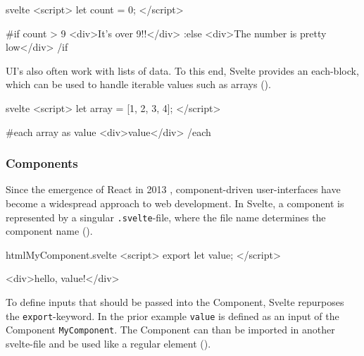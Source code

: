\begin{listing}[h!]
\begin{myminted}{svelte}{}
<script>
  let count = 0;
</script>

{#if count > 9}
  <div>It's over 9!!</div>
{:else}
  <div>The number is pretty low</div>
{/if}
\end{myminted}
\caption{Example usage of Svelte's if-block.}
\label{fig:svelte-if-syntax} 
\end{listing}

UI's also often work with lists of data. To this end, Svelte provides an each-block, which can be used to handle iterable values such as arrays ().

\begin{listing}[h!]
\begin{myminted}{svelte}{}
<script>
  let array = [1, 2, 3, 4];
</script>

{#each array as value}
  <div>{value}</div>
{/each}
\end{myminted}
\caption{Example usage of Svelte's each-block.}
\label{fig:svelte-array-syntax} 
\end{listing}

\subsubsection{Components}


Since the emergence of React in 2013 \cite{occhino_js_2013}, component-driven user-interfaces have become a widespread approach to web development. In Svelte, a component is represented by a singular \texttt{.svelte}-file, where the file name determines the component name ().

\begin{listing}[h!]
\begin{myminted}{html}{MyComponent.svelte}
<script>
  export let value;
</script>

<div>hello, {value}!</div>
\end{myminted}
\caption{Basic Svelte component that defines the input \texttt{value}.}
\label{fig:svelte-component-basic}
\end{listing}

To define inputs that should be passed into the Component, Svelte repurposes the \texttt{export}-keyword. In the prior example \texttt{value} is defined as an input of the Component \texttt{MyComponent}. The Component can than be imported in another svelte-file and be used like a regular element ().

